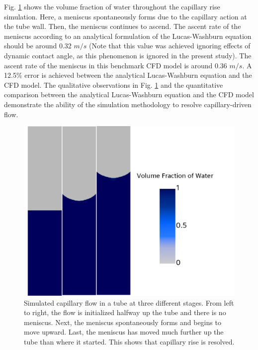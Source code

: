 \documentclass{UCF_ETD}
\begin{document}
Fig. \ref{fig:capillaryRise} shows the volume fraction of water throughout the capillary rise simulation. Here, a meniscus spontaneously forms due to the capillary action at the tube wall. Then, the meniscus continues to ascend. The ascent rate of the meniscus according to an analytical formulation of the Lucas-Washburn equation \cite{HAMRAOUI2002415} should be around 0.32 $m/s$  (Note that this value was achieved ignoring effects of dynamic contact angle, as this phenomenon is ignored in the present study). The ascent rate of the meniscus in this benchmark CFD model is around 0.36 $m/s$. A 12.5\% error is achieved between the analytical Lucas-Washburn equation and the CFD model. The qualitative observations in Fig. \ref{fig:capillaryRise} and the quantitative comparison between the analytical Lucas-Washburn equation and the CFD model demonstrate the ability of the simulation methodology to resolve capillary-driven flow. 

\begin{figure}
    \centering
    \includegraphics[width=\linewidth]{Figures/validation_capillaryRise.png}
    \caption{Simulated capillary flow in a tube at three different stages. From left to right, the flow is initialized halfway up the tube and there is no meniscus. Next, the meniscus spontaneously forms and begins to move upward. Last, the meniscus has moved much further up the tube than where it started. This shows that capillary rise is resolved.}
    \label{fig:capillaryRise}
\end{figure}
\end{document}
